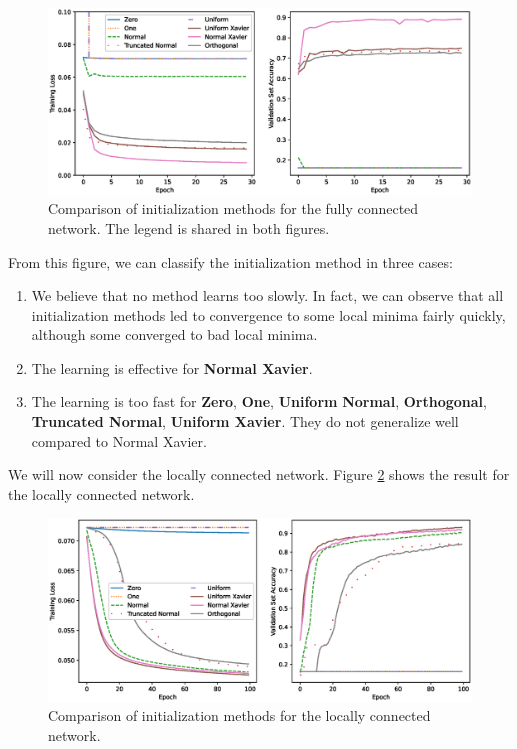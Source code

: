 \documentclass[
	12pt, %
]{../Template/fphw}
\begin{document}
\begin{enumerate}[label = (\arabic*)]
    \begin{figure}[!htbp]
        \centering
        \includegraphics[width=\textwidth]{initialization_comparison}
        \caption{Comparison of initialization methods for the fully connected network. The legend is shared in both figures.}
        \label{fig:init_fc}
    \end{figure}
    From this figure, we can classify the initialization method in three cases:
    \begin{enumerate}[label=(\roman*)]
        \item We believe that no method learns too slowly. In fact, we can observe that all initialization methods led to convergence to some local minima fairly quickly, although some converged to bad local minima.
        \item The learning is effective for \textbf{Normal Xavier}.
        \item The learning is too fast for  \textbf{Zero}, \textbf{One}, \textbf{Uniform} \textbf{Normal}, \textbf{Orthogonal}, \textbf{Truncated Normal}, \textbf{Uniform Xavier}. They do not generalize well compared to Normal Xavier.
    \end{enumerate}
    We will now consider the locally connected network. Figure  \ref{fig:init_lc} shows the result for the locally connected network.

    \begin{figure}[!htbp]
        \centering
        \includegraphics[width=\textwidth]{initialization_comparison_lc}
        \caption{Comparison of initialization methods for the locally connected network.}
        \label{fig:init_lc}
    \end{figure}


\end{enumerate}
\end{document}
